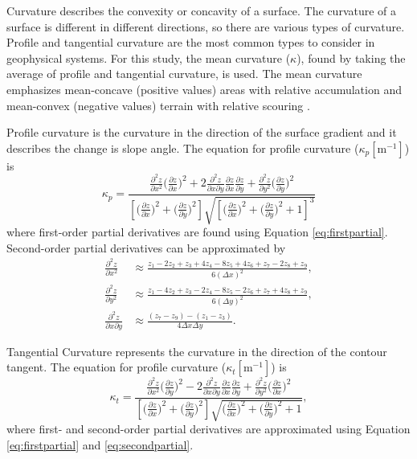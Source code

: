 \documentclass{sfuthesis}
\begin{document}
Curvature describes the convexity or concavity of a surface. The curvature of a surface is different in different directions, so there are various types of curvature. Profile and tangential curvature are the most common types to consider in geophysical systems. For this study, the mean curvature ($\kappa$), found by taking the average of profile and tangential curvature, is used. The mean curvature emphasizes mean-concave (positive values) areas with relative accumulation and mean-convex (negative values) terrain with relative scouring \citep{Olaya2009}.

Profile curvature is the curvature in the direction of the surface gradient and it describes the change is slope angle. The equation for profile curvature ($\kappa_p \left[\mathrm{m}^{-1}\right]$) is \citep{Neteler2008}
\begin{equation} 
\kappa_p = \frac{\frac{\partial^2 z}{\partial x^2} \big(\frac{\partial z}{\partial x}\big)^2 + 2\frac{\partial^2 z}{\partial x \partial y}\frac{\partial z}{\partial x}\frac{\partial z}{\partial y} +  \frac{\partial^2 z}{\partial y^2} \big(\frac{\partial z}{\partial y}\big)^2}{\left[\big( \frac{\partial z}{\partial x} \big) ^2 + \big(\frac{\partial z}{\partial y} \big)^2\right] \sqrt{\left[\big(\frac{\partial z}{\partial x} \big) ^2 + \big( \frac{\partial z}{\partial y}\big) ^2+1\right]^3}}
\end{equation} 
where first-order partial derivatives are found using Equation \ref{eq:firstpartial}. Second-order partial derivatives can be approximated by \citep{Hofierka2009, Neteler2008}
\begin{align}\label{eq:secondpartial}
\frac{\partial^2 z}{\partial x^2} &\approx\frac{z_1-2z_2+z_3+4z_4-8z_5+4z_6+z_7-2z_8+z_9}{6  (\Delta x)^2},\nonumber\\
\frac{\partial^2 z}{\partial y^2} &\approx \frac{z_1-4z_2+z_3-2z_4-8z_5-2z_6+z_7+4z_8+z_9}{6  (\Delta y)^2},\nonumber\\
\frac{\partial^2 z}{\partial x \partial y} &\approx \frac{(z_7-z_9)-(z_1-z_3)}{4  \Delta x \Delta y}.
\end{align}

Tangential Curvature represents the curvature in the direction of the contour tangent. The equation for profile curvature ($\kappa_t \left[\mathrm{m}^{-1}\right]$) is \citep{Neteler2008}
\begin{equation}
\kappa_t = \frac{\frac{\partial^2 z}{\partial x^2} \big(\frac{\partial z}{\partial y}\big)^2 - 2\frac{\partial^2 z}{\partial x \partial y}\frac{\partial z}{\partial x}\frac{\partial z}{\partial y} +  \frac{\partial^2 z}{\partial y^2} \big(\frac{\partial z}{\partial x}\big)^2}{\left[\big( \frac{\partial z}{\partial x} \big) ^2 + \big(\frac{\partial z}{\partial y} \big)^2\right] \sqrt{\big(\frac{\partial z}{\partial x} \big) ^2 + \big( \frac{\partial z}{\partial y}\big) ^2 +1}},
\end{equation} 	
where first- and second-order partial derivatives are approximated using Equation \ref{eq:firstpartial} and \ref{eq:secondpartial}. 
\end{document}

